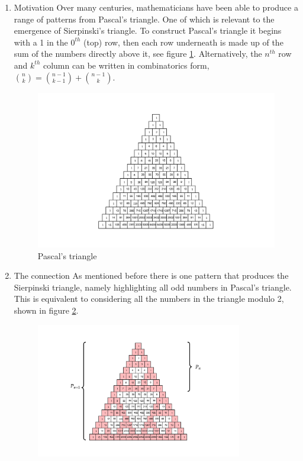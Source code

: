 \documentclass[11pt]{article}
\begin{document}
\begin{enumerate}
\item Motivation
\label{sec:org8e5aac5}
Over many centuries, mathematicians have been able to produce a range of patterns from Pascal's triangle. One of which is relevant to the emergence of Sierpinski's triangle. To construct Pascal's triangle it begins with a 1 in the \(0^{th}\) (top) row, then each row underneath is made up of the sum of the numbers directly above it, see figure \ref{fig:pascal-triangle}. Alternatively, the \(n^{th}\) row and \(k^{th}\) column can be written in combinatorics form, \(\binom{n}{k} = \binom{n-1}{k-1} + \binom{n-1}{k}\).

\begin{figure}[htbp]
\centering
\includegraphics[width=.9\linewidth]{media/tikz/pascals-triangle.png}
\caption{\label{fig:pascal-triangle}Pascal's triangle}
\end{figure}

\item The connection
\label{sec:org2e007fd}
As mentioned before there is one pattern that produces the Sierpinski triangle, namely highlighting all odd numbers in Pascal's triangle. This is equivalent to considering all the numbers in the triangle modulo 2, shown in figure \ref{fig:pascal-sierpinski-tri}.

\begin{figure}[htbp]
\centering
\includegraphics[width=9cm]{media/tikz/pascal-sierpinski-tri.png}
\label{fig:pascal-sierpinski-tri}
\end{figure}


\end{enumerate}
\end{document}
